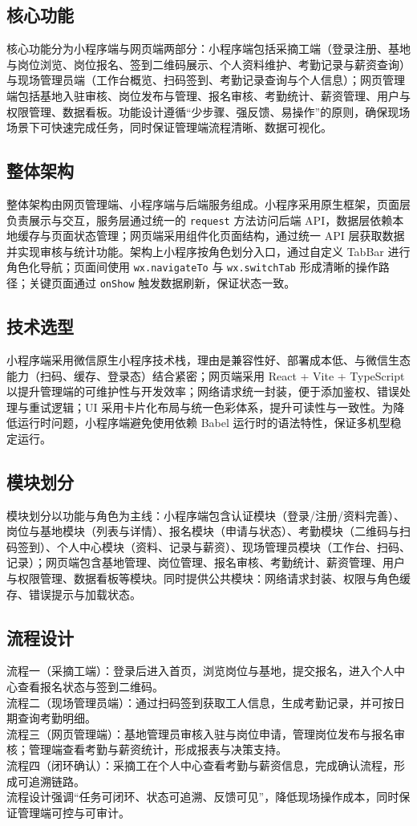 ﻿\documentclass[UTF8,a4paper]{ctexart}
\begin{document}
\subsection{核心功能}
核心功能分为小程序端与网页端两部分：小程序端包括采摘工端（登录注册、基地与岗位浏览、岗位报名、签到二维码展示、个人资料维护、考勤记录与薪资查询）与现场管理员端（工作台概览、扫码签到、考勤记录查询与个人信息）；网页管理端包括基地入驻审核、岗位发布与管理、报名审核、考勤统计、薪资管理、用户与权限管理、数据看板。功能设计遵循“少步骤、强反馈、易操作”的原则，确保现场场景下可快速完成任务，同时保证管理端流程清晰、数据可视化。

\subsection{整体架构}
整体架构由网页管理端、小程序端与后端服务组成。小程序采用原生框架，页面层负责展示与交互，服务层通过统一的 \texttt{request} 方法访问后端 API，数据层依赖本地缓存与页面状态管理；网页端采用组件化页面结构，通过统一 API 层获取数据并实现审核与统计功能。架构上小程序按角色划分入口，通过自定义 TabBar 进行角色化导航；页面间使用 \texttt{wx.navigateTo} 与 \texttt{wx.switchTab} 形成清晰的操作路径；关键页面通过 \texttt{onShow} 触发数据刷新，保证状态一致。

\subsection{技术选型}
小程序端采用微信原生小程序技术栈，理由是兼容性好、部署成本低、与微信生态能力（扫码、缓存、登录态）结合紧密；网页端采用 React + Vite + TypeScript 以提升管理端的可维护性与开发效率；网络请求统一封装，便于添加鉴权、错误处理与重试逻辑；UI 采用卡片化布局与统一色彩体系，提升可读性与一致性。为降低运行时问题，小程序端避免使用依赖 Babel 运行时的语法特性，保证多机型稳定运行。

\subsection{模块划分}
模块划分以功能与角色为主线：小程序端包含认证模块（登录/注册/资料完善）、岗位与基地模块（列表与详情）、报名模块（申请与状态）、考勤模块（二维码与扫码签到）、个人中心模块（资料、记录与薪资）、现场管理员模块（工作台、扫码、记录）；网页端包含基地管理、岗位管理、报名审核、考勤统计、薪资管理、用户与权限管理、数据看板等模块。同时提供公共模块：网络请求封装、权限与角色缓存、错误提示与加载状态。

\subsection{流程设计}
流程一（采摘工端）：登录后进入首页，浏览岗位与基地，提交报名，进入个人中心查看报名状态与签到二维码。\\
流程二（现场管理员端）：通过扫码签到获取工人信息，生成考勤记录，并可按日期查询考勤明细。\\
流程三（网页管理端）：基地管理员审核入驻与岗位申请，管理岗位发布与报名审核；管理端查看考勤与薪资统计，形成报表与决策支持。\\
流程四（闭环确认）：采摘工在个人中心查看考勤与薪资信息，完成确认流程，形成可追溯链路。\\
流程设计强调“任务可闭环、状态可追溯、反馈可见”，降低现场操作成本，同时保证管理端可控与可审计。
\end{document}

